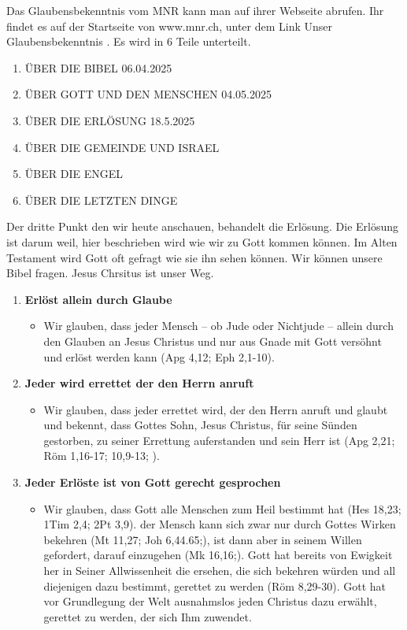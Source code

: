 \documentclass{../../inc/mybib}
\begin{document}
\begin{spacing}{1.5}
Das Glaubensbekenntnis vom MNR kann man auf ihrer Webseite abrufen. Ihr findet es auf der Startseite von www.mnr.ch, unter dem Link \frqq Unser Glaubensbekenntnis \flqq{}. Es wird in 6 Teile unterteilt.
\begin{enumerate}
    \item \uppercase{über die bibel} 06.04.2025
    \item \uppercase{über gott und den Menschen} 04.05.2025
    \item \uppercase{über die Erlösung} 18.5.2025
    \item \uppercase{über die Gemeinde und Israel}
    \item \uppercase{über die Engel}
    \item \uppercase{über die letzten Dinge}
\end{enumerate}
Der dritte Punkt den wir heute anschauen, behandelt die Erlösung. Die Erlösung ist darum weil, hier beschrieben wird wie wir zu Gott kommen können. Im Alten Testament wird Gott oft gefragt wie sie ihn sehen können. Wir können unsere Bibel fragen. Jesus Chrsitus ist unser Weg. 
\begin{enumerate}      
      \item \textbf{Erlöst allein durch Glaube} 
        \begin{itemize}
            \item Wir glauben, dass jeder Mensch -- ob Jude oder Nichtjude -- allein durch den Glauben an Jesus Christus und nur aus Gnade mit Gott versöhnt und erlöst werden kann (Apg 4,12; Eph 2,1-10).
        \end{itemize}
        \item \textbf{Jeder wird errettet der den Herrn anruft}
            \begin{itemize}
                \item Wir glauben, dass jeder errettet wird, der den Herrn anruft und glaubt und bekennt, dass Gottes Sohn, Jesus Christus, für seine Sünden gestorben, zu seiner Errettung auferstanden und sein Herr ist (Apg 2,21; Röm 1,16-17; 10,9-13; ).
            \end{itemize}            
        \item \textbf{Jeder Erlöste ist von Gott gerecht gesprochen}
            \begin{itemize}
                \item Wir glauben, dass Gott alle Menschen zum Heil bestimmt hat (Hes 18,23; 1Tim 2,4; 2Pt 3,9). der Mensch kann sich zwar nur durch Gottes Wirken bekehren (Mt 11,27; Joh 6,44.65;), ist dann aber in seinem Willen gefordert, darauf einzugehen (Mk 16,16;). Gott hat bereits von Ewigkeit her in Seiner Allwissenheit die ersehen, die sich bekehren würden und all diejenigen dazu bestimmt, gerettet zu werden (Röm 8,29-30). Gott hat vor Grundlegung der Welt ausnahmslos jeden Christus dazu erwählt, gerettet zu werden, der sich Ihm zuwendet.

\end{itemize}
\end{enumerate}
\end{spacing}
\end{document}
